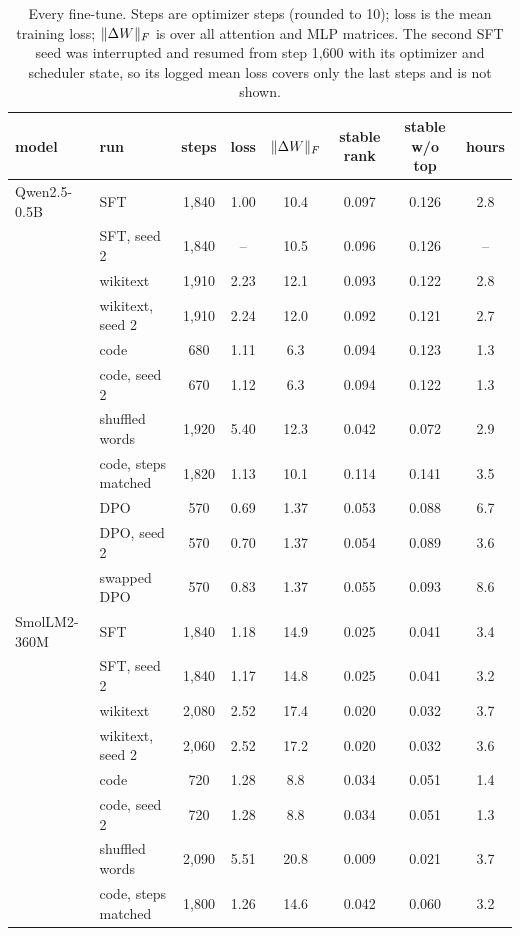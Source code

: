 \begin{table}[H]
\caption{Every fine-tune. Steps are optimizer steps (rounded to 10); loss is
the mean training loss; $\|\Delta W\|_F$ is over all attention and MLP matrices.
The second SFT seed was interrupted and resumed from step 1{,}600 with its
optimizer and scheduler state, so its logged mean loss covers only the last
steps and is not shown.}
\label{tab:runs}
\begin{center}
\small
\begin{tabular}{llcccccc}
\toprule
model & run & steps & loss & $\|\Delta W\|_F$ & stable rank & stable w/o top & hours \\
\midrule
Qwen2.5-0.5B & SFT               & 1{,}840 & 1.00 & 10.4 & 0.097 & 0.126 & 2.8 \\
             & SFT, seed 2       & 1{,}840 & --   & 10.5 & 0.096 & 0.126 & -- \\
             & wikitext          & 1{,}910 & 2.23 & 12.1 & 0.093 & 0.122 & 2.8 \\
             & wikitext, seed 2  & 1{,}910 & 2.24 & 12.0 & 0.092 & 0.121 & 2.7 \\
             & code              & 680     & 1.11 & 6.3  & 0.094 & 0.123 & 1.3 \\
             & code, seed 2      & 670     & 1.12 & 6.3  & 0.094 & 0.122 & 1.3 \\
             & shuffled words    & 1{,}920 & 5.40 & 12.3 & 0.042 & 0.072 & 2.9 \\
             & code, steps matched & 1{,}820 & 1.13 & 10.1 & 0.114 & 0.141 & 3.5 \\
             & DPO               & 570     & 0.69 & 1.37 & 0.053 & 0.088 & 6.7 \\
             & DPO, seed 2       & 570     & 0.70 & 1.37 & 0.054 & 0.089 & 3.6 \\
             & swapped DPO       & 570     & 0.83 & 1.37 & 0.055 & 0.093 & 8.6 \\
\midrule
SmolLM2-360M & SFT               & 1{,}840 & 1.18 & 14.9 & 0.025 & 0.041 & 3.4 \\
             & SFT, seed 2       & 1{,}840 & 1.17 & 14.8 & 0.025 & 0.041 & 3.2 \\
             & wikitext          & 2{,}080 & 2.52 & 17.4 & 0.020 & 0.032 & 3.7 \\
             & wikitext, seed 2  & 2{,}060 & 2.52 & 17.2 & 0.020 & 0.032 & 3.6 \\
             & code              & 720     & 1.28 & 8.8  & 0.034 & 0.051 & 1.4 \\
             & code, seed 2      & 720     & 1.28 & 8.8  & 0.034 & 0.051 & 1.3 \\
             & shuffled words    & 2{,}090 & 5.51 & 20.8 & 0.009 & 0.021 & 3.7 \\
             & code, steps matched & 1{,}800 & 1.26 & 14.6 & 0.042 & 0.060 & 3.2 \\
\bottomrule
\end{tabular}
\end{center}
\end{table}

